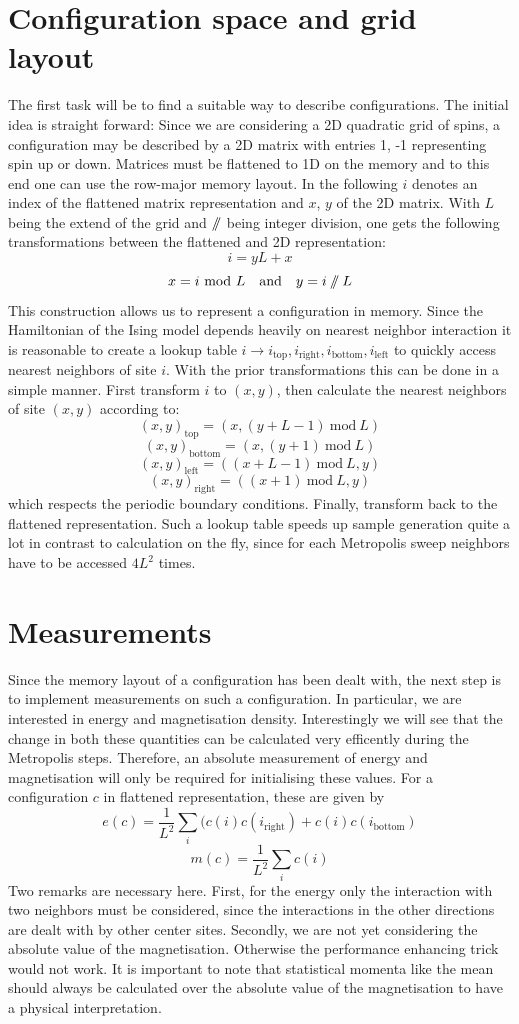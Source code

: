 \documentclass[11pt, a4paper]{scrartcl}
\newcommand{\mod}{\ \mathrm{mod} \ }
\newcommand{\git}{\mathbin{
  \mathchoice{/\mkern-6mu/}%
    {/\mkern-6mu/}%
    {/\mkern-5mu/}%
    {/\mkern-5mu/}}}%
\begin{document}
\section{Configuration space and grid layout}
The first task will be to find a suitable way to describe configurations. The initial idea is straight forward: Since we are considering a 2D quadratic grid of spins, a configuration may be described by a 2D matrix with entries {1, -1} representing spin up or down. Matrices must be flattened to 1D on the memory and to this end one can use the row-major memory layout. In the following $i$ denotes an index of the flattened matrix representation and $x$, $y$ of the 2D matrix. With $L$ being the extend of the grid and $\git$ being integer division, one gets the following transformations between the flattened and 2D representation:
$$
i = yL + x
$$
$$
x = i \mod L \ \ \ \mathrm{and} \ \ \ y = i \git L
$$
This construction allows us to represent a configuration in memory. Since the Hamiltonian of the Ising model depends heavily on nearest neighbor interaction it is reasonable to create a lookup table $i \rightarrow {i_{\mathrm{top}}, i_{\mathrm{right}}, i_{\mathrm{bottom}}, i_{\mathrm{left}}}$ to quickly access nearest neighbors of site $i$. With the prior transformations this can be done in a simple manner. First transform $i$ to $(x,y)$, then calculate the nearest neighbors of site $(x,y)$ according to:
$$
(x,y)_{\mathrm{top}} = (x, (y+L-1) \mod L)
$$
$$
(x,y)_{\mathrm{bottom}} = (x, (y+1) \mod L)
$$
$$
(x,y)_{\mathrm{left}} = ((x+L-1) \mod L, y)
$$
$$
(x,y)_{\mathrm{right}} = ((x+1) \mod L, y)
$$
which respects the periodic boundary conditions. Finally, transform back to the flattened representation. Such a lookup table speeds up sample generation quite a lot in contrast to calculation on the fly, since for each Metropolis sweep neighbors have to be accessed $4 L^2$ times.

\section{Measurements}
Since the memory layout of a configuration has been dealt with, the next step is to implement measurements on such a configuration. In particular, we are interested in energy and magnetisation density. Interestingly we will see that the change in both these quantities can be calculated very efficently during the Metropolis steps. Therefore, an absolute measurement of energy and magnetisation will only be required for initialising these values. For a configuration $c$ in flattened representation, these are given by
$$
e(c) = \frac{1}{L^2}\sum_i ( c(i)c(i_{\mathrm{right}}) + c(i)c(i_{\mathrm{bottom}})
$$
$$
m(c) = \frac{1}{L^2} \sum_i c(i)
$$
Two remarks are necessary here. First, for the energy only the interaction with two neighbors must be considered, since the interactions in the other directions are dealt with by other center sites. Secondly, we are not yet considering the absolute value of the magnetisation. Otherwise the performance enhancing trick would not work. It is important to note that statistical momenta like the mean should always be calculated over the absolute value of the magnetisation to have a physical interpretation.
\end{document}
